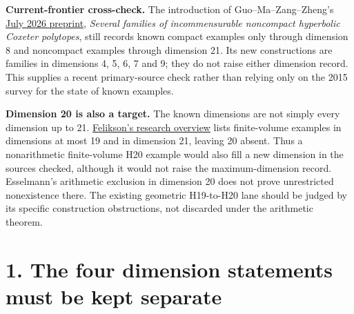 \documentclass[
  10pt,
]{report}
\newcounter{none} %
\begin{document}
\textbf{Current-frontier cross-check.} The introduction of
Guo--Ma--Zang--Zheng's \href{https://arxiv.org/pdf/2607.14715}{July 2026
preprint}, \emph{Several families of incommensurable noncompact
hyperbolic Coxeter polytopes}, still records known compact examples only
through dimension 8 and noncompact examples through dimension 21. Its
new constructions are families in dimensions 4, 5, 6, 7 and 9; they do
not raise either dimension record. This supplies a recent primary-source
check rather than relying only on the 2015 survey for the state of known
examples.

\textbf{Dimension 20 is also a target.} The known dimensions are not
simply every dimension up to 21.
\href{https://www.maths.dur.ac.uk/users/anna.felikson/Polytopes/polytopes.html}{Felikson's
research overview} lists finite-volume examples in dimensions at most 19
and in dimension 21, leaving 20 absent. Thus a nonarithmetic
finite-volume H20 example would also fill a new dimension in the sources
checked, although it would not raise the maximum-dimension record.
Esselmann's arithmetic exclusion in dimension 20 does not prove
unrestricted nonexistence there. The existing geometric H19-to-H20 lane
should be judged by its specific construction obstructions, not
discarded under the arithmetic theorem.

\section{1. The four dimension statements must be kept
separate}\label{the-four-dimension-statements-must-be-kept-separate}
\end{document}
